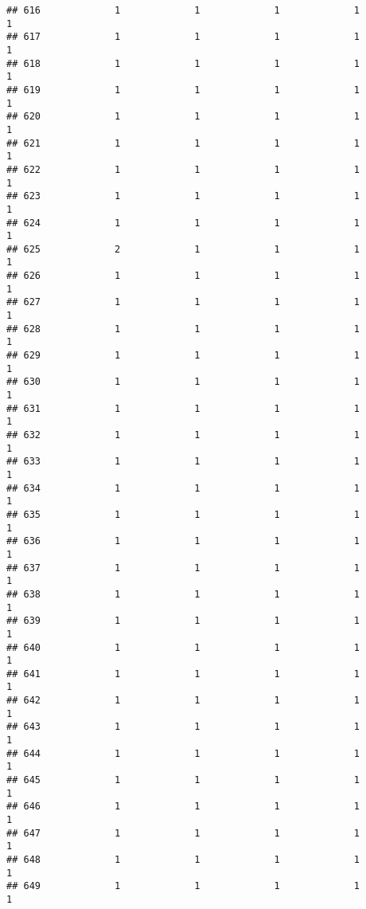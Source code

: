 \documentclass[
]{article}
\begin{document}
\begin{verbatim}
## 616             1             1             1             1             1
## 617             1             1             1             1             1
## 618             1             1             1             1             1
## 619             1             1             1             1             1
## 620             1             1             1             1             1
## 621             1             1             1             1             1
## 622             1             1             1             1             1
## 623             1             1             1             1             1
## 624             1             1             1             1             1
## 625             2             1             1             1             1
## 626             1             1             1             1             1
## 627             1             1             1             1             1
## 628             1             1             1             1             1
## 629             1             1             1             1             1
## 630             1             1             1             1             1
## 631             1             1             1             1             1
## 632             1             1             1             1             1
## 633             1             1             1             1             1
## 634             1             1             1             1             1
## 635             1             1             1             1             1
## 636             1             1             1             1             1
## 637             1             1             1             1             1
## 638             1             1             1             1             1
## 639             1             1             1             1             1
## 640             1             1             1             1             1
## 641             1             1             1             1             1
## 642             1             1             1             1             1
## 643             1             1             1             1             1
## 644             1             1             1             1             1
## 645             1             1             1             1             1
## 646             1             1             1             1             1
## 647             1             1             1             1             1
## 648             1             1             1             1             1
## 649             1             1             1             1             1

\end{verbatim}
\end{document}
